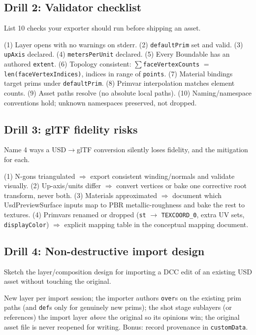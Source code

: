 \subsection*{Drill 2: Validator checklist}
List 10 checks your exporter should run before shipping an asset.
\begin{DrillSolution}
(1) Layer opens with no warnings on stderr. (2) \texttt{defaultPrim} set and
valid. (3) \texttt{upAxis} declared. (4) \texttt{metersPerUnit} declared.
(5) Every Boundable has an authored \texttt{extent}. (6) Topology consistent:
$\sum$\texttt{faceVertexCounts} $=$ \texttt{len(faceVertexIndices)}, indices
in range of \texttt{points}. (7) Material bindings target prims under
\texttt{defaultPrim}. (8) Primvar interpolation matches element counts.
(9) Asset paths resolve (no absolute local paths). (10) Naming/namespace
conventions hold; unknown namespaces preserved, not dropped.
\end{DrillSolution}

\subsection*{Drill 3: glTF fidelity risks}
Name 4 ways a USD$\rightarrow$glTF conversion silently loses fidelity, and
the mitigation for each.
\begin{DrillSolution}
(1) N-gons triangulated $\Rightarrow$ export consistent winding/normals and
validate visually. (2) Up-axis/units differ $\Rightarrow$ convert vertices or
bake one corrective root transform, never both. (3) Materials approximated
$\Rightarrow$ document which UsdPreviewSurface inputs map to PBR
metallic-roughness and bake the rest to textures. (4) Primvars renamed or
dropped (\texttt{st} $\rightarrow$ \texttt{TEXCOORD\_0}, extra UV sets,
\texttt{displayColor}) $\Rightarrow$ explicit mapping table in the conceptual
mapping document.
\end{DrillSolution}

\subsection*{Drill 4: Non-destructive import design}
Sketch the layer/composition design for importing a DCC edit of an existing
USD asset without touching the original.
\begin{DrillSolution}
New layer per import session; the importer authors \texttt{over}s on the
existing prim paths (and \texttt{def}s only for genuinely new prims); the
shot stage sublayers (or references) the import layer \emph{above} the
original so its opinions win; the original asset file is never reopened for
writing. Bonus: record provenance in \texttt{customData}.
\end{DrillSolution}

